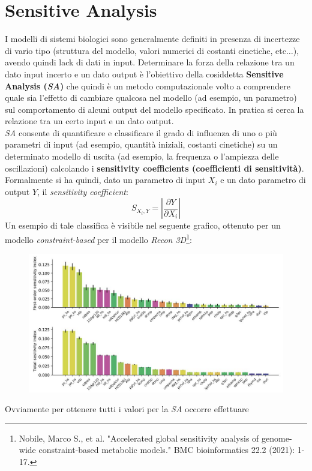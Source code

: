 \documentclass[a4paper,12pt, oneside]{book}
\begin{document}
\section{Sensitive Analysis}
I modelli di sistemi biologici sono generalmente definiti in presenza di
incertezze di vario tipo (struttura del modello, valori numerici di costanti
cinetiche, etc$\ldots$), avendo quindi lack di dati in input. Determinare la
forza della relazione tra un dato input 
incerto e un dato output è l'obiettivo della cosiddetta \textbf{Sensitive
  Analysis (\textit{SA})} che quindi è un  metodo computazionale volto a
comprendere quale sia l'effetto di cambiare qualcosa nel modello (ad esempio, un
parametro) sul comportamento di alcuni output del modello specificato. In
pratica si cerca la relazione tra un certo input e un dato output.\\
\textit{SA} consente di quantificare e classificare il grado di influenza di uno
o più parametri di input (ad esempio, quantità iniziali, costanti cinetiche) su
un determinato modello di uscita (ad esempio, la frequenza o l'ampiezza delle
oscillazioni) calcolando i \textbf{sensitivity coefficients
  (\textbf{coefficienti di sensitività})}. Formalmente si ha quindi, dato un
parametro di input $X_i$ e un dato parametro di output $Y$, il
\textit{sensitivity coefficient}:
\[S_{X_i,Y}=\left|\frac{\partial Y}{\partial X_i}\right|\]
\newpage
Un esempio di tale classifica è visibile nel seguente grafico, ottenuto per un
modello \textit{constraint-based} per il modello \textit{Recon
  3D}\footnote{Nobile, Marco 
  S., et 
  al. "Accelerated global sensitivity analysis of genome-wide constraint-based
  metabolic models." BMC bioinformatics 22.2 (2021): 1-17.}: 
\begin{figure}[H]
  \centering
  \includegraphics[scale = 0.3]{img/rob6.jpg}
\end{figure}
Ovviamente per ottenere tutti i valori per la \textit{SA} occorre effettuare
\end{document}
